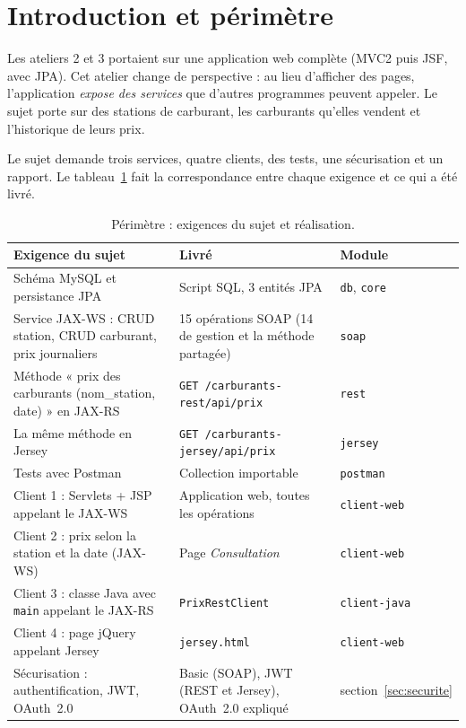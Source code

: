 \documentclass[11pt,a4paper]{article}
\newcommand{\code}[1]{\texttt{#1}}
\begin{document}
\section{Introduction et périmètre}
Les ateliers 2 et 3 portaient sur une application web complète (MVC2 puis JSF, avec JPA). Cet atelier change de perspective : au lieu d'afficher des pages, l'application \emph{expose des services} que d'autres programmes peuvent appeler. Le sujet porte sur des stations de carburant, les carburants qu'elles vendent et l'historique de leurs prix.

Le sujet demande trois services, quatre clients, des tests, une sécurisation et un rapport. Le tableau~\ref{tab:perimetre} fait la correspondance entre chaque exigence et ce qui a été livré.

\begin{table}[H]
\centering
\small
\begin{tabular}{@{}p{5.6cm}p{6.2cm}p{3cm}@{}}
\toprule
\textbf{Exigence du sujet} & \textbf{Livré} & \textbf{Module} \\
\midrule
Schéma MySQL et persistance JPA & Script SQL, 3 entités JPA & \code{db}, \code{core}\\
Service JAX-WS : CRUD station, CRUD carburant, prix journaliers & 15 opérations SOAP (14 de gestion et la méthode partagée) & \code{soap}\\
Méthode « prix des carburants (nom\_station, date) » en JAX-RS & \code{GET /carburants-rest/api/prix} & \code{rest}\\
La même méthode en Jersey & \code{GET /carburants-jersey/api/prix} & \code{jersey}\\
Tests avec Postman & Collection importable & \code{postman}\\
Client 1 : Servlets + JSP appelant le JAX-WS & Application web, toutes les opérations & \code{client-web}\\
Client 2 : prix selon la station et la date (JAX-WS) & Page \emph{Consultation} & \code{client-web}\\
Client 3 : classe Java avec \code{main} appelant le JAX-RS & \code{PrixRestClient} & \code{client-java}\\
Client 4 : page jQuery appelant Jersey & \code{jersey.html} & \code{client-web}\\
Sécurisation : authentification, JWT, OAuth~2.0 & Basic (SOAP), JWT (REST et Jersey), OAuth~2.0 expliqué & section~\ref{sec:securite}\\
\bottomrule
\end{tabular}
\caption{Périmètre : exigences du sujet et réalisation.}
\label{tab:perimetre}
\end{table}
\end{document}
